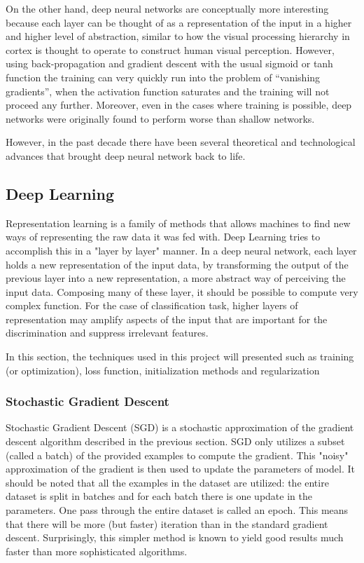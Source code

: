 On the other hand, deep neural networks are conceptually more interesting because each layer can be thought of as a representation of the input in a higher and higher level of abstraction, similar to how the visual processing hierarchy in cortex is thought to operate to construct human visual perception. However, using back-propagation and gradient descent with the usual sigmoid or tanh function the training can very quickly run into the problem of “vanishing gradients”, when the activation function saturates and the training will not proceed any further. Moreover, even in the cases where training is possible, deep networks were originally found to perform worse than shallow networks. \cite{NNDL} \cite{Larochelleyoutube}

However, in the past decade there have been several theoretical and technological advances that brought deep neural network back to life.

\subsection{Deep Learning}
\label{subsec:Deep-Learning}
Representation learning is a family of methods that allows machines to find new ways of representing the raw data it was fed with. Deep Learning tries to accomplish this in a "layer by layer" manner. In a deep neural network, each layer holds a new representation of the input data, by transforming the output of the previous layer into a new representation, a more abstract way of perceiving the input data. Composing many of these layer, it should be possible to compute very complex function. For the case of classification task, higher layers of representation may amplify aspects of the input that are important for the discrimination and suppress irrelevant features. \cite{lecun2015deep}

In this section, the techniques used in this project will presented such as training (or optimization), loss function, initialization methods and regularization

\subsubsection{Stochastic Gradient Descent}
\label{subsubsec:SGD}
Stochastic Gradient Descent (SGD) is a stochastic approximation of the gradient descent algorithm described in the previous section. SGD only utilizes a subset (called a batch) of the provided examples to compute the gradient. This "noisy" approximation of the gradient is then used to update the parameters of model. It should be noted that all the examples in the dataset are utilized: the entire dataset is split in batches and for each batch there is one update in the parameters. One pass through the entire dataset is called an epoch. This means that there will be more (but faster) iteration than in the standard gradient descent. Surprisingly, this simpler method is known to yield good results much faster than more sophisticated algorithms.

